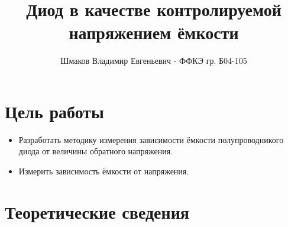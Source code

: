 \documentclass[a4paper, 12pt]{extarticle}
\title{\textcolor{main_title}{Диод в качестве контролируемой напряжением ёмкости}}
\author{Шмаков Владимир Евгеньевич - ФФКЭ гр. Б04-105}
\begin{document}
\maketitle

\section*{\textcolor{header}{Цель работы}}
\begin{itemize}
    \item Разработать методику измерения зависимости ёмкости полупроводникого диода от величины обратного напряжения.
    \item Измерить зависимость ёмкости от напряжения.
\end{itemize}


\section*{\textcolor{header}{Теоретические сведения}}
\end{document}
